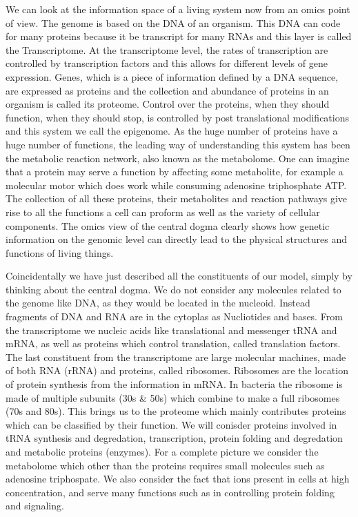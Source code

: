 \documentclass[a4paper,11pt,oneside]{book}
\begin{document}
We can look at the information space of a living system now from an omics point of view. The genome is based on the DNA of an organism. This DNA can code for many proteins because it be transcript for many RNAs and this layer is called the Transcriptome. At the transcriptome level, the rates of transcription are controlled by transcription factors and this allows for different levels of gene expression. Genes, which is a piece of information defined by a DNA sequence, are expressed as proteins and the collection and abundance of proteins in an organism is called its proteome. Control over the proteins, when they should function, when they should stop, is controlled by post translational modifications and this system we call the epigenome. As the huge number of proteins have a huge number of functions, the leading way of understanding this system has been the metabolic reaction network, also known as the metabolome. One can imagine that a protein may serve a function by affecting some metabolite, for example a molecular motor which does work while consuming adenosine triphosphate ATP. The collection of all these proteins, their metabolites and reaction pathways give rise to all the functions a cell can proform as well as the variety of cellular components. The omics view of the central dogma clearly shows how genetic information on the genomic level can directly lead to the physical structures and functions of living things.

Coincidentally we have just described all the constituents of our model, simply by thinking about the central dogma. We do not consider any molecules related to the genome like DNA, as they would be located in the nucleoid. Instead fragments of DNA and RNA are in the cytoplas as Nucliotides and bases. From the transcriptome we nucleic acids like translational and messenger tRNA and mRNA, as well as proteins which control translation, called translation factors. The last constituent from the transcriptome are large molecular machines, made of both RNA (rRNA) and proteins, called ribosomes. Ribosomes are the location of protein synthesis from the information in mRNA. In bacteria the ribosome is made of multiple subunits (30s \& 50s) which combine to make a full ribosomes (70s and 80s). This brings us to the proteome which mainly contributes proteins which can be classified by their function. We will conisder proteins involved in tRNA synthesis and degredation, transcription, protein folding and degredation and metabolic proteins (enzymes). For a complete picture we consider the metabolome which other than the proteins requires small molecules such as adenosine triphospate. We also consider the fact that ions present in cells at high concentration, and serve many functions such as in controlling protein folding and signaling.
\end{document}
